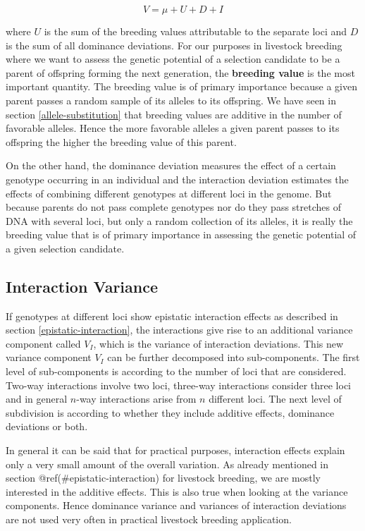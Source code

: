 \documentclass[
]{book}
\theoremstyle{definition}
\theoremstyle{definition}
\theoremstyle{definition}
\theoremstyle{remark}
\begin{document}
\begin{equation}
V = \mu + U + D + I
\label{eq:AggregateGenotypicValueMultipleLoci}
\end{equation}

where \(U\) is the sum of the breeding values attributable to the separate loci and \(D\) is the sum of all dominance deviations. For our purposes in livestock breeding where we want to assess the genetic potential of a selection candidate to be a parent of offspring forming the next generation, the \textbf{breeding value} is the most important quantity. The breeding value is of primary importance because a given parent passes a random sample of its alleles to its offspring. We have seen in section \ref{allele-substitution} that breeding values are additive in the number of favorable alleles. Hence the more favorable alleles a given parent passes to its offspring the higher the breeding value of this parent.

On the other hand, the dominance deviation measures the effect of a certain genotype occurring in an individual and the interaction deviation estimates the effects of combining different genotypes at different loci in the genome. But because parents do not pass complete genotypes nor do they pass stretches of DNA with several loci, but only a random collection of its alleles, it is really the breeding value that is of primary importance in assessing the genetic potential of a given selection candidate.

\hypertarget{interaction-variance}{%
\subsection{Interaction Variance}\label{interaction-variance}}

If genotypes at different loci show epistatic interaction effects as described in section \ref{epistatic-interaction}, the interactions give rise to an additional variance component called \(V_I\), which is the variance of interaction deviations. This new variance component \(V_I\) can be further decomposed into sub-components. The first level of sub-components is according to the number of loci that are considered. Two-way interactions involve two loci, three-way interactions consider three loci and in general \(n\)-way interactions arise from \(n\) different loci. The next level of subdivision is according to whether they include additive effects, dominance deviations or both.

In general it can be said that for practical purposes, interaction effects explain only a very small amount of the overall variation. As already mentioned in section @ref(\#epistatic-interaction) for livestock breeding, we are mostly interested in the additive effects. This is also true when looking at the variance components. Hence dominance variance and variances of interaction deviations are not used very often in practical livestock breeding application.
\end{document}
